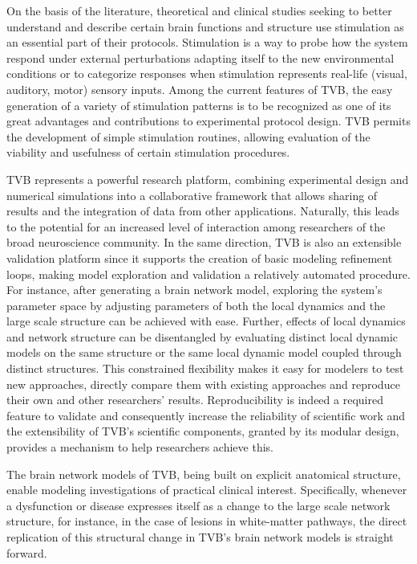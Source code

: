 \documentclass{bioinfo}
\begin{document}
     On the basis of the literature, theoretical and clinical studies seeking to 
     better understand and describe certain brain functions and structure use 
     stimulation as an essential part of their protocols. Stimulation is a way 
     to probe how the system respond under external perturbations adapting itself 
     to the new environmental conditions or to categorize responses when 
     stimulation represents real-life (visual, auditory, motor) sensory inputs. 
     Among the current features of TVB, the easy generation of a variety of 
     stimulation patterns is to be recognized as one of its great advantages and 
     contributions to experimental protocol design. TVB permits the development 
     of simple stimulation routines, allowing evaluation of the viability and usefulness 
     of certain stimulation procedures. 
     
     TVB represents a powerful research platform, combining experimental design
     and numerical simulations into a collaborative framework that allows 
     sharing of results and the integration of data from other applications. 
     Naturally, this leads to the potential for an increased level of 
     interaction among researchers of the broad neuroscience community. In the 
     same direction, TVB is also an extensible validation platform since it 
     supports the creation of basic modeling refinement loops, making model 
     exploration and validation a relatively automated procedure. For instance,  
     after generating a brain network model, exploring the system's parameter 
     space by adjusting parameters of both the local dynamics and the large
     scale structure can be achieved with ease. Further, effects of local 
     dynamics and network structure can be disentangled by evaluating distinct
     local dynamic models on the same structure or the same local dynamic 
     model coupled through distinct structures. This constrained flexibility
     makes it easy for modelers to test new approaches, directly compare them
     with existing approaches and reproduce their own and other researchers' 
     results. Reproducibility is indeed a required feature to validate and 
     consequently increase the reliability of scientific work 
     \citep{Donoho_2010} and the extensibility of TVB's scientific 
     components, granted by its modular design, provides a mechanism to help 
     researchers achieve this. 
     
     The brain network models of TVB, being built on explicit anatomical 
     structure, enable modeling investigations of practical clinical interest.
     Specifically, whenever a dysfunction or disease expresses itself as a 
     change to the large scale network structure, for instance, in the case of 
     lesions in white-matter pathways, the direct replication of this 
     structural change in TVB's brain network models is straight forward.
     
\end{document}
